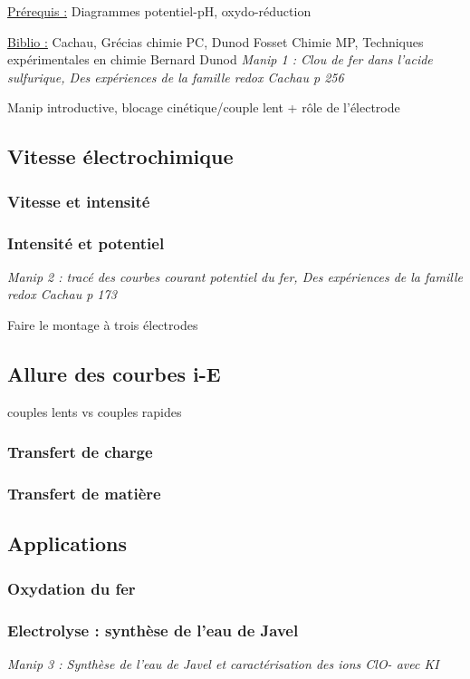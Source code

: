 \documentclass{article}%
\begin{document}
\underline{Prérequis :} Diagrammes potentiel-pH, oxydo-réduction

\underline{Biblio :} Cachau, Grécias chimie PC, Dunod Fosset Chimie MP, Techniques expérimentales en chimie Bernard Dunod
\textit{Manip 1 : Clou de fer dans l'acide sulfurique, Des expériences de la famille redox Cachau p 256}

Manip introductive, blocage cinétique/couple lent + rôle de l'électrode
\subsection{Vitesse électrochimique}
\subsubsection{Vitesse et intensité}
\subsubsection{Intensité et potentiel}
\textit{Manip 2 : tracé des courbes courant potentiel du fer, Des expériences de la famille redox Cachau p 173}

Faire le montage à trois électrodes
\subsection{Allure des courbes i-E}

couples lents vs couples rapides
\subsubsection{Transfert de charge}
\subsubsection{Transfert de matière}
\subsection{Applications}
\subsubsection{Oxydation du fer}
\subsubsection{Electrolyse : synthèse de l'eau de  Javel}
\textit{Manip 3 : Synthèse de l'eau de Javel et caractérisation des ions ClO- avec KI}
\end{document}
